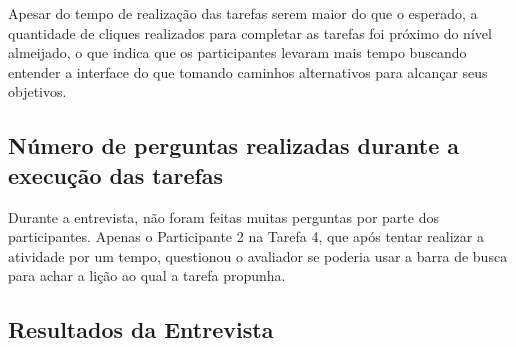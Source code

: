 Apesar do tempo de realização das tarefas serem maior do que o esperado, a quantidade de cliques realizados para completar as tarefas foi próximo do nível almeijado, o que indica que os participantes levaram mais tempo buscando entender a interface do que tomando caminhos alternativos para alcançar seus objetivos.

\subsection{Número de perguntas realizadas durante a execução das tarefas}
Durante a entrevista, não foram feitas muitas perguntas por parte dos participantes. Apenas o Participante 2 na Tarefa 4, que após tentar realizar a atividade por um tempo, questionou o avaliador se poderia usar a barra de busca para achar a lição ao qual a tarefa propunha.

\subsection{Resultados da Entrevista}

